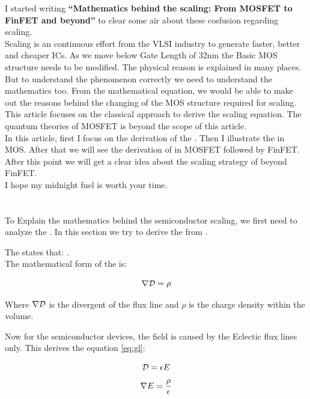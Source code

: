 \documentclass[a4paper]{article}
\begin{document}
I started writing \textbf{``Mathematics behind the scaling: From MOSFET to FinFET and beyond''} to clear some air about these cosfusion regarding scaling.\\

Scaling is an continuous effort from the VLSI industry to generate faster, better and cheaper ICs. As we move below Gate Length of 32nm the Basic MOS structure needs to be modified. The physical reason is explained in many places. But to understand the phenomenon correctly we need to understand the mathematics too. From the mathematical equation, we would be able to make out the reasons behind the changing of the MOS structure required for scaling.\\

This article focuses on the classical approach to derive the scaling equation. The quantum theories of MOSFET is beyond the scope of this article.\\

In this article, first I focus on the derivation of the \PE. Then I illustrate the \PE in MOS. After that we will see the derivation of \PE in MOSFET followed by FinFET. After this point we will get a clear idea about the scaling strategy of beyond FinFET.\\

I hope my midnight fuel is worth your time.
\pagebreak

\section{\PE}
\label{sec:poisson}
To Explain the mathematics behind the semiconductor scaling, we first need to analyze the \PE.
In this section we try to derive the \PE from \GL.

The \GL states that: \GLstate.\\
The mathematical form of the \GL is:

\begin{equation}
  \label{eq:gl}
  \nabla \mathcal{D} = \rho
\end{equation}

Where $\nabla \mathcal{D}$ is the divergent of the flux line and $\rho$ is the charge density within the volume.

Now for the semiconductor devices, the field is caused by the Eclectic flux lines only. This derives the equation \ref{eq:gl}:

\begin{equation}
  \mathcal{D} = \epsilon E\\
\end{equation}
\begin{equation}
  \label{eq:divE}
  \nabla E = \frac{\rho}{\epsilon}
\end{equation}
\end{document}
